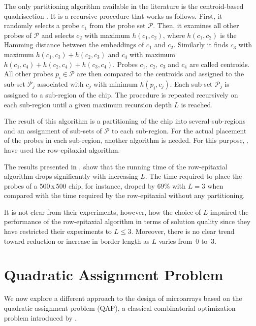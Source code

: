 \documentclass{bioinfo}
\begin{document}
The only partitioning algorithm available in the literature is the centroid-based quadrisection \citep{KAHNG03B}. It is a recursive procedure that works as follows. First, it randomly selects a probe $c_1$ from the probe set $\mathcal{P}$. Then, it examines all other probes of $\mathcal{P}$ and selects $c_2$ with maximum $h(c_1,c_2)$, where $h(c_1,c_2)$ is the Hamming distance between the embeddings of $c_1$ and $c_2$. Similarly it finds $c_3$ with maximum $h(c_1,c_3) + h(c_2,c_3)$ and $c_4$ with maximum $h(c_1,c_4) + h(c_2,c_4) + h(c_3,c_4)$. Probes $c_1$, $c_2$, $c_3$ and $c_4$ are called centroids. All other probes $p_i \in \mathcal{P}$ are then compared to the centroids and assigned to the sub-set $\mathcal{P}_j$ associated with $c_j$ with minimum $h(p_i,c_j)$. Each sub-set $\mathcal{P}_j$ is assigned to a sub-region of the chip. The procedure is repeated recursively on each sub-region until a given maximum recursion depth $L$ is reached.

The result of this algorithm is a partitioning of the chip into several sub-regions and an assignment of sub-sets of $\mathcal{P}$ to each sub-region. For the actual placement of the probes in each sub-region, another algorithm is needed. For this purpose, \citealp{KAHNG03B}, have used the row-epitaxial algorithm.

The results presented in \citealp{KAHNG03B}, show that the running time of the row-epitaxial algorithm drops significantly with increasing $L$. The time required to place the probes of a 500\,x\,500 chip, for instance, droped by 69\% with $L = 3$ when compared with the time required by the row-epitaxial without any partitioning.

It is not clear from their experiments, however, how the choice of $L$ impaired the performance of the row-epitaxial algorithm in terms of solution quality since they have restricted their experiments to $L \leq 3$. Moreover, there is no clear trend toward reduction or increase in border length as $L$ varies from~0 to~3.

\section{Quadratic Assignment Problem}
\label{sec:qap}

We now explore a different approach to the design of microarrays based on the quadratic assignment problem (QAP), a classical combinatorial optimization problem introduced by \citealp{KOOPMANS57}.
\end{document}
